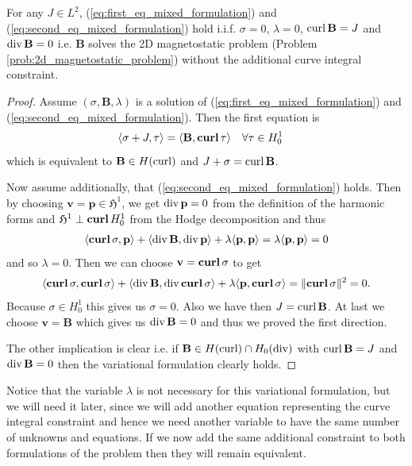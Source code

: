 \documentclass[../master_thesis.tex]{subfiles}
\begin{document}
\begin{proposition}
    For any $J \in L^2$, (\ref{eq:first_eq_mixed_formulation}) and 
    (\ref{eq:second_eq_mixed_formulation}) hold i.i.f. 
    $\sigma = 0$, $\lambda=0$, $\curl \mathbf{B} = J$ and 
    $\diver \mathbf{B} = 0$
    i.e. $\mathbf{B}$ solves the 2D magnetostatic problem (Problem\,\ref{prob:2d_magnetostatic_problem})  
    without the additional curve integral
    constraint.
\end{proposition}
\begin{proof}
    Assume $(\sigma,\mathbf{B},\lambda)$ is a solution of (\ref{eq:first_eq_mixed_formulation}) and 
    (\ref{eq:second_eq_mixed_formulation}). Then the first equation is
    \begin{align*}
        \langle \sigma + J, \tau \rangle  
        &=  \langle \mathbf{B}, \veccurl\tau \rangle  \quad \forall \tau \in H^1_0
    \end{align*}
    which is equivalent to $\mathbf{B} \in H(\curl)$ and $J + \sigma = \curl \mathbf{B}$.

    Now assume additionally, that  
    (\ref{eq:second_eq_mixed_formulation}) holds. Then by choosing $\mathbf{v} = \mathbf{p} \in \mathfrak{H}^1$,
    we get $\diver \mathbf{p} = 0$ from the definition of the harmonic forms 
    and $\mathfrak{H}^1 \perp \veccurl H^1_0$ from the Hodge decomposition and thus
    \begin{align*}
        \langle \veccurl \sigma, \mathbf{p} \rangle + \langle \diver \mathbf{B}, \diver\mathbf{p}\rangle 
            + \lambda\langle \mathbf{p}, \mathbf{p} \rangle
        = \lambda \langle \mathbf{p}, \mathbf{p}\rangle = 0
    \end{align*}
    and so $\lambda = 0$. Then we can choose $\mathbf{v} = \veccurl \sigma$ to get 
    \begin{align*}
        \langle \veccurl \sigma, \veccurl \sigma \rangle + \langle \diver \mathbf{B}, \diver \veccurl \sigma \rangle 
            + \lambda \langle \mathbf{p}, \veccurl \sigma \rangle
        = \lVert \veccurl \sigma \rVert^2 = 0.
    \end{align*}
    Because $\sigma \in H^1_0$ this gives us $\sigma = 0$. Also we have then 
    $J = \curl \mathbf{B}$. At last we choose $\mathbf{v} = \mathbf{B}$ which gives us 
    $\diver \mathbf{B} = 0$ and thus we proved the first direction. 

    The other implication is clear i.e. if $\mathbf{B} \in H(\curl) \cap H_0(\diver)$
    with $\curl \mathbf{B} = J$ and $\diver \mathbf{B} = 0$ then the variational 
    formulation clearly holds.
    \end{proof}
Notice that the variable $\lambda$ is not necessary for this variational formulation, 
but we will need it later, since we will add another equation representing the 
curve integral constraint and hence we need another variable to have the same 
number of unknowns and equations.
If we now add the same additional constraint to both formulations of the problem 
then they will remain equivalent.
\end{document}
